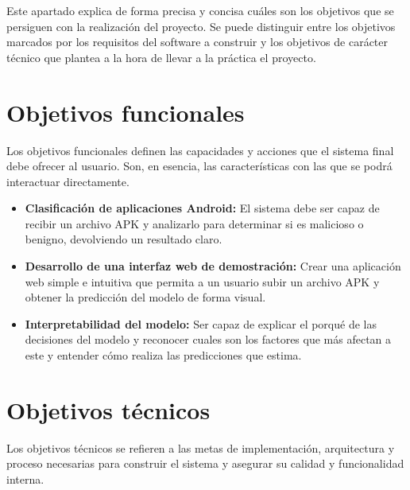 
Este apartado explica de forma precisa y concisa cuáles son los objetivos que se persiguen con la realización del proyecto. Se puede distinguir entre los objetivos marcados por los requisitos del software a construir y los objetivos de carácter técnico que plantea a la hora de llevar a la práctica el proyecto.

\section{Objetivos funcionales}
Los objetivos funcionales definen las capacidades y acciones que el sistema final debe ofrecer al usuario. Son, en esencia, las características con las que se podrá interactuar directamente.

\begin{itemize}
	\item \textbf{Clasificación de aplicaciones Android:} El sistema debe ser capaz de recibir un archivo APK y analizarlo para determinar si es malicioso o benigno, devolviendo un resultado claro.
	
	\item \textbf{Desarrollo de una interfaz web de demostración:} Crear una aplicación web simple e intuitiva que permita a un usuario subir un archivo APK y obtener la predicción del modelo de forma visual.
	
	\item \textbf{Interpretabilidad del modelo:} Ser capaz de explicar el porqué de las decisiones del modelo y reconocer cuales son los factores que más afectan a este y entender cómo realiza las predicciones que estima.
\end{itemize}

\section{Objetivos técnicos}
Los objetivos técnicos se refieren a las metas de implementación, arquitectura y proceso necesarias para construir el sistema y asegurar su calidad y funcionalidad interna.

